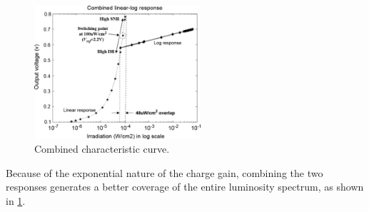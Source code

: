 \begin{figure}[H]
    \includegraphics[width=0.55\textwidth, height=0.50\textwidth]{resources/png/combinedGraph.png}
    \caption{Combined characteristic curve. \cite{withScience} \label{figCurveCombined}}
\end{figure}

Because of the exponential nature of the charge gain, combining the two responses generates a better coverage
of the entire luminosity spectrum, as shown in \ref{figCurveCombined}.


